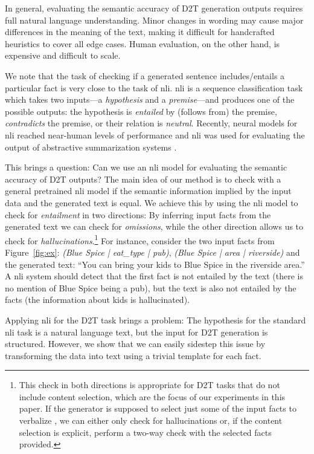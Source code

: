 In general, evaluating the semantic accuracy of D2T generation outputs requires full natural language understanding. Minor changes in wording may cause major differences in the meaning of the text, making it difficult for handcrafted heuristics to cover all edge cases. Human evaluation, on the other hand, is expensive and difficult to scale.

We note that the task of checking if a generated sentence includes/entails a particular fact is very close to the task of \ac{nli}. \ac{nli} is a sequence classification task which takes two inputs---a \textit{hypothesis} and a \textit{premise}---and produces one of the possible outputs: the hypothesis is \textit{entailed} by (follows from) the premise, \textit{contradicts} the premise, or their relation is \textit{neutral}. Recently, neural models for \ac{nli} \cite{zhang2019,liu-etal-2019-multi,liu_roberta_2019} reached near-human levels of performance and \ac{nli} was used for evaluating the output of abstractive summarization systems \cite{maynez-etal-2020-faithfulness}.

This brings a question: Can we use an \ac{nli} model for evaluating the semantic accuracy of D2T outputs?
The main idea of our method is to check with a general pretrained \ac{nli} model if the semantic information implied by the input data and the generated text is equal. We achieve this by using the \ac{nli} model to check for \textit{entailment} in two directions: By inferring input facts from the generated text we can check for \textit{omissions}, while the other direction allows us to check for \textit{hallucinations}.\footnote{This check in both directions is appropriate for D2T tasks that do not include content selection, which are the focus of our experiments in this paper. If the generator is supposed to select just some of the input facts to verbalize \cite[cf.~e.g.][]{wiseman_challenges_2017}, we can either only check for hallucinations or, if the content selection is explicit, perform a two-way check with the selected facts provided.}
For instance, consider the two input facts from Figure~\ref{fig:ex}: \emph{(Blue Spice | eat\_type | pub)}, \emph{(Blue Spice | area | riverside)} and the generated text: “You can bring your kids to Blue Spice in the riverside area.” A \ac{nli} system should detect that the first fact is not entailed by the text (there is no mention of Blue Spice being a pub), but the text is also not entailed by the facts (the information about kids is hallucinated).

Applying \ac{nli} for the D2T task brings a problem:
The hypothesis for the standard \ac{nli} task is a natural language text, but the input for D2T generation is structured. However, we show that we can easily sidestep this issue by transforming the data into text using a trivial template for each fact.


